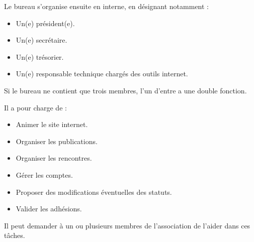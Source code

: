 \documentclass[11pt]{article}
\begin{document}
Le bureau s'organise ensuite en interne, en désignant notamment :
\begin{itemize}
	\item Un(e) président(e).
	\item Un(e) secrétaire.
	\item Un(e) trésorier.
	\item Un(e) responsable technique chargés des outils internet.
\end{itemize}
Si le bureau ne contient que trois membres, l'un d'entre a une double fonction. 

Il a pour charge de :
\begin{itemize}
	\item Animer le site internet.
	\item Organiser les publications.
	\item Organiser les rencontres.
	\item Gérer les comptes.
	\item Proposer des modifications éventuelles des statuts.
	\item Valider les adhésions.
\end{itemize}

Il peut demander à un ou plusieurs membres de l'association de l'aider dans ces tâches.
\end{document}
